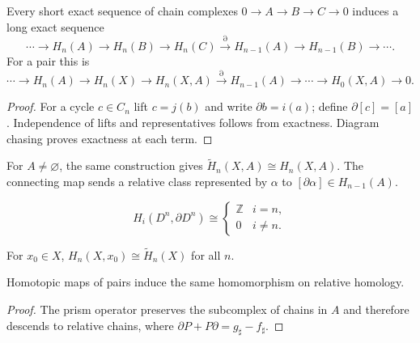 \begin{theorem}
\label{thm:long-exact-sequence-pair}

Every short exact sequence of chain complexes $0\to A\to B\to C\to0$ induces a long exact sequence
\[
\cdots\to H_n(A)\to H_n(B)\to H_n(C)\xrightarrow{\partial}H_{n-1}(A)\to H_{n-1}(B)\to\cdots.
\]
For a pair this is
\[
\cdots\to H_n(A)\to H_n(X)\to H_n(X,A)\xrightarrow{\partial}H_{n-1}(A)\to\cdots\to H_0(X,A)\to0.
\]
\end{theorem}
\begin{proof}
\sketch For a cycle $c\in C_n$ lift $c=j(b)$ and write $\partial b=i(a)$; define $\partial[c]=[a]$.  Independence of lifts and representatives follows from exactness.  Diagram chasing proves exactness at each term.
\end{proof}

For $A\ne\varnothing$, the same construction gives $\widetilde H_n(X,A)\cong H_n(X,A)$.  The connecting map sends a relative class represented by $\alpha$ to $[\partial\alpha]\in H_{n-1}(A)$.

\begin{example}
\label{ex:long-exact-sequence-disk-sphere}

\[
H_i(D^n,\partial D^n)\cong\begin{cases}\mathbb{Z}&i=n,\\0&i\ne n.\end{cases}
\]
\end{example}

\begin{example}
\label{ex:reduced-homology-relative}

For $x_0\in X$, $H_n(X,x_0)\cong\widetilde H_n(X)$ for all $n$.
\end{example}

\begin{proposition}[If two maps $f,g:(X,A)\to(Y,B)$ are homotopic through maps of pairs $(X,A)\to(Y,B)$, then $f_* = g_*:H_n(X,A)\to H_n(Y,B)$]
\label{prop:homotopic-maps-pairs}

Homotopic maps of pairs induce the same homomorphism on relative homology.
\end{proposition}
\begin{proof}
\sketch The prism operator preserves the subcomplex of chains in $A$ and therefore descends to relative chains, where $\partial P+P\partial=g_\sharp-f_\sharp$.
\end{proof}

